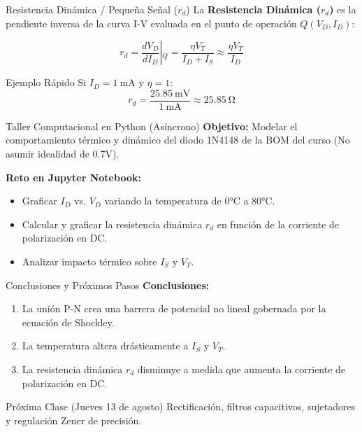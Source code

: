 \documentclass[10pt, aspectratio=169]{beamer}
\begin{document}
\begin{frame}{Resistencia Dinámica / Pequeña Señal ($r_d$)}
  La \textbf{Resistencia Dinámica ($r_d$)} es la pendiente inversa de la curva I-V evaluada en el punto de operación $Q(V_D, I_D)$:
  
  \begin{equation*}
  r_d = \left. \frac{d V_D}{d I_D} \right\vert{}_{Q} = \frac{\eta V_T}{I_D + I_S} \approx \frac{\eta V_T}{I_D}
  \end{equation*}
  
  \begin{exampleblock}{Ejemplo Rápido}
  Si $I_D = \SI{1}{\milli\ampere}$ y $\eta = 1$:
  \begin{equation*}
  r_d = \frac{\SI{25.85}{\milli\volt}}{\SI{1}{\milli\ampere}} \approx \SI{25.85}{\ohm}
  \end{equation*}
  \end{exampleblock}
\end{frame}

\begin{frame}{Taller Computacional en Python (Asíncrono)}
  \textbf{Objetivo:} Modelar el comportamiento térmico y dinámico del diodo 1N4148 de la BOM del curso (No asumir idealidad de 0.7V).
  \vspace{0.3cm}
  
  \textbf{Reto en Jupyter Notebook:}
  \begin{itemize}
      \item Graficar $I_D$ vs. $V_D$ variando la temperatura de 0°C a 80°C.
      \item Calcular y graficar la resistencia dinámica $r_d$ en función de la corriente de polarización en DC.
      \item Analizar impacto térmico sobre $I_S$ y $V_T$.
  \end{itemize}
\end{frame}

\begin{frame}{Conclusiones y Próximos Pasos}
  \textbf{Conclusiones:}
  \begin{enumerate}
      \item La unión P-N crea una barrera de potencial no lineal gobernada por la ecuación de Shockley.
      \item La temperatura altera drásticamente a $I_S$ y $V_T$.
      \item La resistencia dinámica $r_d$ disminuye a medida que aumenta la corriente de polarización en DC.
  \end{enumerate}
  \vspace{0.4cm}
  \begin{alertblock}{Próxima Clase (Jueves 13 de agosto)}
  Rectificación, filtros capacitivos, sujetadores y regulación Zener de precisión.
  \end{alertblock}
\end{frame}
\end{document}
